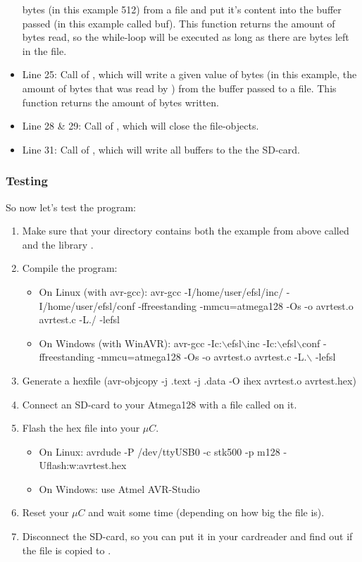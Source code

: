 \begin{itemize}
{		bytes (in this example 512) from a file and put it's content into
		the buffer passed (in this example called buf). This function returns
		the amount of bytes read, so the while-loop will be executed as long
		as there are bytes left in the file.}
	\item{Line 25: Call of , which will write a given value
		of bytes (in this example, the amount of bytes that was read
		by ) from the buffer passed to a file. This function returns
		the amount of bytes written.}
	\item{Line 28 \& 29: Call of , which will close the
		file-objects.}
	\item{Line 31: Call of , which will write all buffers to
		the the SD-card.}
\end{itemize}
\subsubsection{Testing}
So now let's test the program:
\begin{enumerate}
	\item
	{
		Make sure that your directory contains both the example from above
		called  and the library .
	}
	\item
	{	Compile the program:
		\begin{itemize}
			\item{On Linux (with avr-gcc): avr-gcc -I/home/user/efsl/inc/ 
				-I/home/user/efsl/conf -ffreestanding -mmcu=atmega128 -Os -o 
				avrtest.o avrtest.c -L./ -lefsl}
			\item{On Windows (with WinAVR): avr-gcc 
				-Ic:$\backslash$efsl$\backslash$inc
				-Ic:$\backslash$efsl$\backslash$conf 
				-ffreestanding -mmcu=atmega128 -Os -o
				avrtest.o avrtest.c -L.$\backslash$ -lefsl}
		\end{itemize}
	}
	\item{Generate a hexfile 
		(avr-objcopy -j .text -j .data -O ihex avrtest.o avrtest.hex)}
	\item{Connect an SD-card to your Atmega128 with a file called 
		 on it.}
	\item
	{
		Flash the hex file into your $\mu C$.
		\begin{itemize}
			\item{On Linux: avrdude -P /dev/ttyUSB0 -c stk500 -p m128 -Uflash:w:avrtest.hex}
			\item{On Windows: use Atmel AVR-Studio}
		\end{itemize}
	}
	\item{Reset your $\mu C$ and wait some time (depending on how big
		the file  is).}
	\item{Disconnect the SD-card, so you can put it in your cardreader
		and find out if the file  is copied to 
		.}
\end{enumerate}
